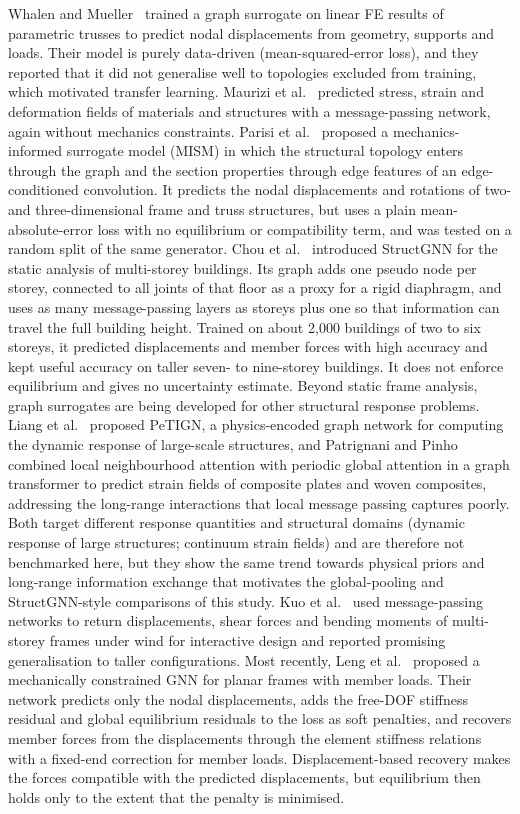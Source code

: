 Whalen and Mueller~\cite{whalen2022truss} trained a graph surrogate on linear FE results of parametric trusses to predict nodal displacements from geometry, supports and loads. Their model is purely data-driven (mean-squared-error loss), and they reported that it did not generalise well to topologies excluded from training, which motivated transfer learning. Maurizi et al.~\cite{maurizi2022gnn} predicted stress, strain and deformation fields of materials and structures with a message-passing network, again without mechanics constraints. Parisi et al.~\cite{parisi2024mism} proposed a mechanics-informed surrogate model (MISM) in which the structural topology enters through the graph and the section properties through edge features of an edge-conditioned convolution. It predicts the nodal displacements and rotations of two- and three-dimensional frame and truss structures, but uses a plain mean-absolute-error loss with no equilibrium or compatibility term, and was tested on a random split of the same generator. Chou et al.~\cite{chou2024structgnn} introduced StructGNN for the static analysis of multi-storey buildings. Its graph adds one pseudo node per storey, connected to all joints of that floor as a proxy for a rigid diaphragm, and uses as many message-passing layers as storeys plus one so that information can travel the full building height. Trained on about 2{,}000 buildings of two to six storeys, it predicted displacements and member forces with high accuracy and kept useful accuracy on taller seven- to nine-storey buildings. It does not enforce equilibrium and gives no uncertainty estimate. Beyond static frame analysis, graph surrogates are being developed for other structural response problems. Liang et al.~\cite{liang2026petign} proposed PeTIGN, a physics-encoded graph network for computing the dynamic response of large-scale structures, and Patrignani and Pinho~\cite{patrignani2026hybrid} combined local neighbourhood attention with periodic global attention in a graph transformer to predict strain fields of composite plates and woven composites, addressing the long-range interactions that local message passing captures poorly. Both target different response quantities and structural domains (dynamic response of large structures; continuum strain fields) and are therefore not benchmarked here, but they show the same trend towards physical priors and long-range information exchange that motivates the global-pooling and StructGNN-style comparisons of this study. Kuo et al.~\cite{kuo2025gnn} used message-passing networks to return displacements, shear forces and bending moments of multi-storey frames under wind for interactive design and reported promising generalisation to taller configurations. Most recently, Leng et al.~\cite{leng2026mcgnn} proposed a mechanically constrained GNN for planar frames with member loads. Their network predicts only the nodal displacements, adds the free-DOF stiffness residual and global equilibrium residuals to the loss as soft penalties, and recovers member forces from the displacements through the element stiffness relations with a fixed-end correction for member loads. Displacement-based recovery makes the forces compatible with the predicted displacements, but equilibrium then holds only to the extent that the penalty is minimised.

